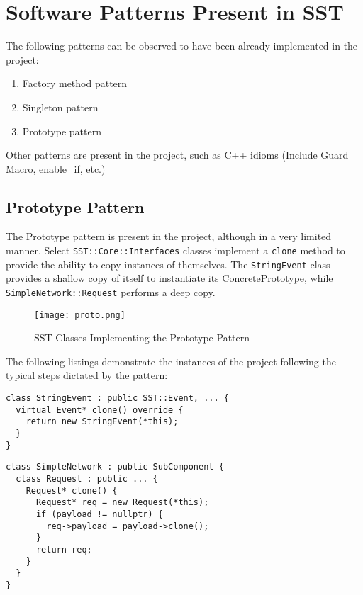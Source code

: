 
\section{Software Patterns Present in SST}
The following patterns can be observed to have been already implemented in the project:
\begin{enumerate}
  \item Factory method pattern
  \item Singleton pattern
  \item Prototype pattern
\end{enumerate}
Other patterns are present in the project, such as C++ idioms (Include Guard Macro, enable\_if, etc.)





\subsection{Prototype Pattern}
The Prototype pattern is present in the project, although in a very limited manner. Select \texttt{SST::Core::Interfaces} classes implement a \texttt{clone} method to provide the ability to copy instances of themselves. The \texttt{StringEvent} class provides a shallow copy of itself to instantiate its ConcretePrototype, while \texttt{SimpleNetwork::Request} performs a deep copy.

\begin{figure}[h]
  \caption{SST Classes Implementing the Prototype Pattern}
  \centering
  \texttt{[image: proto.png]}
\end{figure}

The following listings demonstrate the instances of the project following the typical steps dictated by the pattern:

\begin{lstlisting}[style=customC++,label=prototype1,caption=StringEvent Implementing the Prototype Pattern \\ File: src/sst/core/interfaces/stringEvent.h]
class StringEvent : public SST::Event, ... {
  virtual Event* clone() override {
    return new StringEvent(*this);
  }
}
\end{lstlisting}

\begin{lstlisting}[style=customC++,label=prototype2,caption=SimpleNetwork::Request Implementing the Prototype Pattern \\ File: src/sst/core/interfaces/simpleNetwork.h]
class SimpleNetwork : public SubComponent {
  class Request : public ... {
    Request* clone() {
      Request* req = new Request(*this);
      if (payload != nullptr) {
        req->payload = payload->clone();
      }
      return req;
    }
  }
}
\end{lstlisting}
